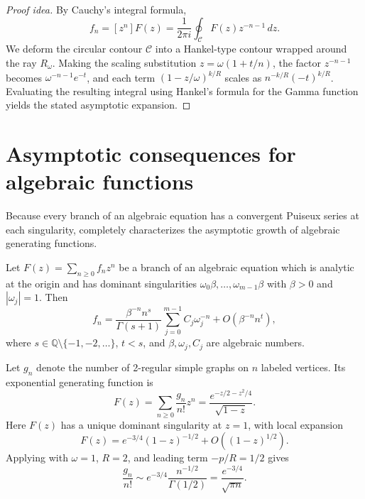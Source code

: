 \begin{proof}[Proof idea]
    By Cauchy's integral formula,
    \[
        f_n = [z^n] F(z) = \frac{1}{2\pi i} \oint_{\mathcal{C}} F(z) z^{-n-1} \, dz.
    \]
    We deform the circular contour \(\mathcal{C}\) into a Hankel-type contour wrapped around the ray \(R_\omega\).
    Making the scaling substitution \(z = \omega(1 + t/n)\), the factor \(z^{-n-1}\) becomes \(\omega^{-n-1} e^{-t}\), and each term \((1 - z/\omega)^{k/R}\) scales as \(n^{-k/R} (-t)^{k/R}\).
    Evaluating the resulting integral using Hankel's formula for the Gamma function yields the stated asymptotic expansion.
\end{proof}


\section*{Asymptotic consequences for algebraic functions}

Because every branch of an algebraic equation has a convergent Puiseux series at each singularity,  completely characterizes the asymptotic growth of algebraic generating functions.

\begin{corollary}
    \label{cor:algebraic-asymptotics}
    Let \(F(z) = \sum_{n \ge 0} f_n z^n\) be a branch of an algebraic equation which is analytic at the origin and has dominant singularities \(\omega_0 \beta, \dots, \omega_{m-1}\beta\) with \(\beta > 0\) and \(|\omega_j| = 1\). Then
    \[
        f_n = \frac{\beta^{-n} n^s}{\Gamma(s+1)} \sum_{j=0}^{m-1} C_j \omega_j^{-n} + O\left( \beta^{-n} n^t \right),
    \]
    where \(s \in \mathbb{Q} \setminus \{-1, -2, \dots\}\), \(t < s\), and \(\beta, \omega_j, C_j\) are algebraic numbers.
\end{corollary}

\begin{example}
    Let \(g_n\) denote the number of 2-regular simple graphs on \(n\) labeled vertices.
    Its exponential generating function is
    \[
        F(z) = \sum_{n \ge 0} \frac{g_n}{n!} z^n = \frac{e^{-z/2 - z^2/4}}{\sqrt{1-z}}.
    \]
    Here \(F(z)\) has a unique dominant singularity at \(z = 1\), with local expansion
    \[
        F(z) = e^{-3/4} (1-z)^{-1/2} + O\left( (1-z)^{1/2} \right).
    \]
    Applying  with \(\omega = 1\), \(R = 2\), and leading term \(-p/R = 1/2\) gives
    \[
        \frac{g_n}{n!} \sim e^{-3/4} \frac{n^{-1/2}}{\Gamma(1/2)} = \frac{e^{-3/4}}{\sqrt{\pi n}}.
    \]
\end{example}